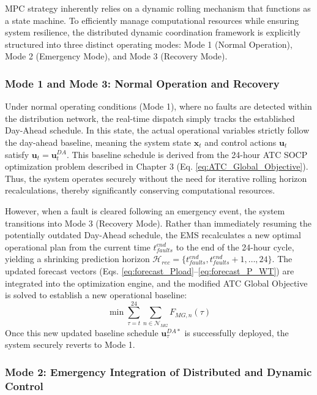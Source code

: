 MPC strategy inherently relies on a dynamic rolling mechanism that functions as a state machine. To efficiently manage computational resources while ensuring system resilience, the distributed dynamic coordination framework is explicitly structured into three distinct operating modes: Mode 1 (Normal Operation), Mode 2 (Emergency Mode), and Mode 3 (Recovery Mode).

\subsubsection{Mode 1 and Mode 3: Normal Operation and Recovery}

Under normal operating conditions (Mode 1), where no faults are detected within the distribution network, the real-time dispatch simply tracks the established Day-Ahead schedule. In this state, the actual operational variables strictly follow the day-ahead baseline, meaning the system state $\mathbf{x}_t$ and control actions $\mathbf{u}_t$ satisfy $\mathbf{u}_t = \mathbf{u}_t^{DA}$. This baseline schedule is derived from the 24-hour ATC SOCP optimization problem described in Chapter 3 (Eq. \ref{eq:ATC_Global_Objective}). Thus, the system operates securely without the need for iterative rolling horizon recalculations, thereby significantly conserving computational resources.

However, when a fault is cleared following an emergency event, the system transitions into Mode 3 (Recovery Mode). Rather than immediately resuming the potentially outdated Day-Ahead schedule, the EMS recalculates a new optimal operational plan from the current time $t^{end}_{faults}$ to the end of the 24-hour cycle, yielding a shrinking prediction horizon $\mathcal{H}_{rec} = \{t^{end}_{faults}, t^{end}_{faults}+1, \dots, 24\}$. The updated forecast vectors (Eqs. \ref{eq:forecast_Pload}--\ref{eq:forecast_P_WT}) are integrated into the optimization engine, and the modified ATC Global Objective is solved to establish a new operational baseline:
\begin{equation} \label{eq:Recovery_Objective}
    \min \sum_{\tau=t}^{24} \sum_{n \in \mathcal{N}_{MG}} F_{MG,n}(\tau)
\end{equation}
Once this new updated baseline schedule $\mathbf{u}_{\tau}^{DA*}$ is successfully deployed, the system securely reverts to Mode 1.

\subsubsection{Mode 2: Emergency Integration of Distributed and Dynamic Control}

